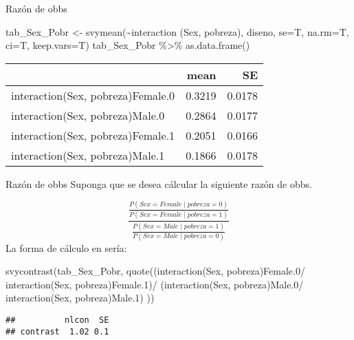 \documentclass[
  ignorenonframetext,
]{beamer}
\newenvironment{Shaded}{\begin{snugshade}}{\end{snugshade}}
\newcommand{\AttributeTok}[1]{\textcolor[rgb]{0.77,0.63,0.00}{#1}}
\newcommand{\FunctionTok}[1]{\textcolor[rgb]{0.00,0.00,0.00}{#1}}
\newcommand{\NormalTok}[1]{#1}
\newcommand{\OtherTok}[1]{\textcolor[rgb]{0.56,0.35,0.01}{#1}}
\newcommand{\SpecialCharTok}[1]{\textcolor[rgb]{0.00,0.00,0.00}{#1}}
\newcommand{\StringTok}[1]{\textcolor[rgb]{0.31,0.60,0.02}{#1}}
\begin{document}
\begin{frame}[fragile]{Razón de obbs}
\protect\hypertarget{razuxf3n-de-obbs-1}{}
\scriptsize

\begin{Shaded}
\begin{Highlighting}[]
\NormalTok{tab\_Sex\_Pobr }\OtherTok{\textless{}{-}} 
   \FunctionTok{svymean}\NormalTok{(}\SpecialCharTok{\textasciitilde{}}\FunctionTok{interaction}\NormalTok{ (Sex, pobreza), diseno, }
             \AttributeTok{se=}\NormalTok{T, }\AttributeTok{na.rm=}\NormalTok{T, }\AttributeTok{ci=}\NormalTok{T, }\AttributeTok{keep.vars=}\NormalTok{T) }
\NormalTok{  tab\_Sex\_Pobr }\SpecialCharTok{\%\textgreater{}\%}  \FunctionTok{as.data.frame}\NormalTok{()}
\end{Highlighting}
\end{Shaded}

\begin{longtable}[]{@{}lrr@{}}
\toprule
& mean & SE \\
\midrule
\endhead
interaction(Sex, pobreza)Female.0 & 0.3219 & 0.0178 \\
interaction(Sex, pobreza)Male.0 & 0.2864 & 0.0177 \\
interaction(Sex, pobreza)Female.1 & 0.2051 & 0.0166 \\
interaction(Sex, pobreza)Male.1 & 0.1866 & 0.0178 \\
\bottomrule
\end{longtable}
\end{frame}

\begin{frame}[fragile]{Razón de obbs}
\protect\hypertarget{razuxf3n-de-obbs-2}{}
Suponga que se desea cálcular la siguiente razón de obbs.

\[
 \frac{\frac{P(Sex = Female \mid pobreza = 0 )}{P(Sex = Female \mid pobreza = 1 )}}{
 \frac{P(Sex = Male \mid pobreza = 1 )}{P(Sex = Male \mid pobreza = 0 )}
 }
\] La forma de cálculo en sería: \footnotesize

\begin{Shaded}
\begin{Highlighting}[]
\FunctionTok{svycontrast}\NormalTok{(tab\_Sex\_Pobr, }
            \FunctionTok{quote}\NormalTok{((}\StringTok{\textasciigrave{}}\AttributeTok{interaction(Sex, pobreza)Female.0}\StringTok{\textasciigrave{}}\SpecialCharTok{/}
                     \StringTok{\textasciigrave{}}\AttributeTok{interaction(Sex, pobreza)Female.1}\StringTok{\textasciigrave{}}\NormalTok{)}\SpecialCharTok{/}
\NormalTok{                  (}\StringTok{\textasciigrave{}}\AttributeTok{interaction(Sex, pobreza)Male.0}\StringTok{\textasciigrave{}}\SpecialCharTok{/}
                     \StringTok{\textasciigrave{}}\AttributeTok{interaction(Sex, pobreza)Male.1}\StringTok{\textasciigrave{}}\NormalTok{) ))}
\end{Highlighting}
\end{Shaded}

\begin{verbatim}
##          nlcon  SE
## contrast  1.02 0.1
\end{verbatim}
\end{frame}
\end{document}
